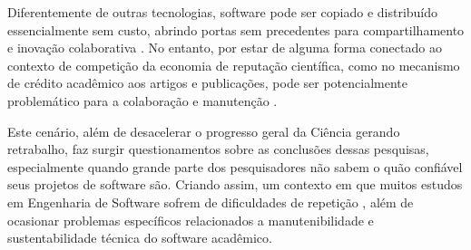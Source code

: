 Diferentemente de outras tecnologias, software pode ser copiado e distribuído
essencialmente sem custo, abrindo portas sem precedentes para
compartilhamento e inovação colaborativa \cite{howison2011scientific}. No
entanto, por estar de alguma forma conectado ao contexto de competição da economia de
reputação científica, como no mecanismo de crédito acadêmico aos artigos e publicações,
pode ser potencialmente problemático para a colaboração e manutenção
\cite{howison2011scientific}.

Este cenário, além de desacelerar o progresso geral da Ciência gerando
retrabalho, faz surgir questionamentos sobre as conclusões dessas pesquisas,
especialmente quando grande parte dos pesquisadores não sabem o quão confiável
seus projetos de software são. Criando assim, um contexto em que muitos estudos
em Engenharia de Software sofrem de dificuldades de repetição
\cite{tang2016worthiness}, além de ocasionar problemas específicos relacionados a
manutenibilidade e sustentabilidade técnica do software acadêmico.
